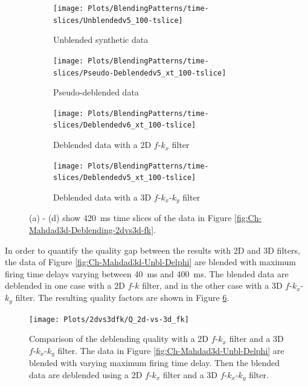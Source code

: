 \begin{figure}
	
	\centering
	\begin{subfigure}[t]{0.45\textwidth}
		\centering
		\texttt{[image: Plots/BlendingPatterns/time-slices/Unblendedv5\_100-tslice]}
		\caption{Unblended synthetic data}
		\label{fig:Ch-Mahdad3d-Unbl-Delphi-tslice}
	\end{subfigure}
	\centering
	\begin{subfigure}[t]{0.45\textwidth}
		\texttt{[image: Plots/BlendingPatterns/time-slices/Pseudo-Deblendedv5\_xt\_100-tslice]}
		\caption{Pseudo-deblended data}
		\label{fig:Ch-Mahdad3d-Deblending-Pseudo-Zoom-tslice}
	\end{subfigure}
	
	\par\bigskip

	\centering
	\begin{subfigure}[t]{0.45\textwidth}
		\texttt{[image: Plots/BlendingPatterns/time-slices/Deblendedv6\_xt\_100-tslice]}
		\caption{Deblended data with a 2D $f$-$k_x$ filter}
		\label{fig:Ch-Mahdad3d-Deblending-2dfk-tslice}
	\end{subfigure}
	\centering
	\begin{subfigure}[t]{0.45\textwidth}
		\texttt{[image: Plots/BlendingPatterns/time-slices/Deblendedv5\_xt\_100-tslice]}
		\caption{Deblended data with a 3D $f$-$k_x$-$k_y$ filter}
		\label{fig:Ch-Mahdad3d-Deblending-3dfk-tslice}
	\end{subfigure}
	
	\caption{(a) - (d) show \SI{420}{\milli\second} time slices of the data in Figure \ref{fig:Ch-Mahdad3d-Deblending-2dvs3d-fk}.}
	\label{fig:Ch-Mahdad3d-Deblending-2dvs3d-fk-tslice}
	
\end{figure}


In order to quantify the quality gap between the results with 2D and 3D filters, the data of Figure \ref{fig:Ch-Mahdad3d-Unbl-Delphi} are blended with maximum firing time delays varying between \SI{40}{\milli\second} and \SI{400}{\milli\second}. The blended data are deblended in one case with a 2D $f$-$k$ filter, and in the other case with a 3D $f$-$k_x$-$k_y$ filter. The resulting quality factors are shown in Figure \ref{fig:Ch-Mahdad3d-2dvs3dfk}.



\begin{figure}
	\centering
	\texttt{[image: Plots/2dvs3dfk/Q\_2d-vs-3d\_fk]}
	\caption{Comparison of the deblending quality with a 2D $f$-$k_x$ filter and a 3D $f$-$k_x$-$k_y$ filter. The data in Figure \ref{fig:Ch-Mahdad3d-Unbl-Delphi} are blended with varying maximum firing time delay. Then the blended data are deblended using a 2D $f$-$k_x$ filter and a 3D $f$-$k_x$-$k_y$ filter.}
	\label{fig:Ch-Mahdad3d-2dvs3dfk}
\end{figure}

